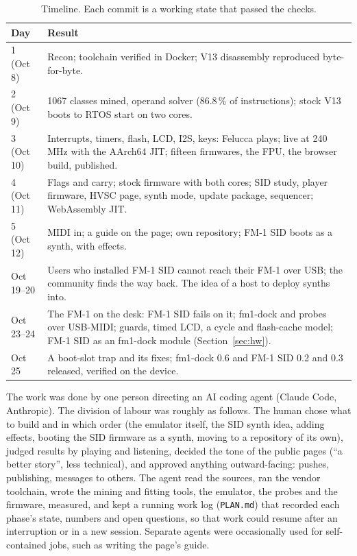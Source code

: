 \documentclass[10pt,a4paper]{article}
\newcommand{\code}[1]{\texttt{#1}}
\begin{document}
\begin{table}[t]
\centering\footnotesize
\begin{tabularx}{\textwidth}{@{}lX@{}}
\toprule
Day & Result\\
\midrule
1 (Oct 8) & Recon; toolchain verified in Docker; V13 disassembly reproduced byte-for-byte.\\
2 (Oct 9) & 1067 classes mined, operand solver (86.8\,\% of instructions); stock V13 boots to RTOS start on two cores.\\
3 (Oct 10) & Interrupts, timers, flash, LCD, I2S, keys: Felucca plays; live at 240\,MHz with the AArch64 JIT; fifteen firmwares, the FPU, the browser build, published.\\
4 (Oct 11) & Flags and carry; stock firmware with both cores; SID study, player firmware, HVSC page, synth mode, update package, sequencer; WebAssembly JIT.\\
5 (Oct 12) & MIDI in; a guide on the page; own repository; FM-1 SID boots as a synth, with effects.\\
Oct 19--20 & Users who installed FM-1 SID cannot reach their FM-1 over USB; the community finds the way back. The idea of a host to deploy synths into.\\
Oct 23--24 & The FM-1 on the desk: FM-1 SID fails on it; fm1-dock and probes over USB-MIDI; guards, timed LCD, a cycle and flash-cache model; FM-1 SID as an fm1-dock module (Section~\ref{sec:hw}).\\
Oct 25 & A boot-slot trap and its fixes; fm1-dock 0.6 and FM-1 SID 0.2 and 0.3 released, verified on the device.\\
\bottomrule
\end{tabularx}
\caption{Timeline. Each commit is a working state that passed the checks.}
\label{tab:time}
\end{table}

The work was done by one person directing an AI coding agent (Claude Code, Anthropic). The division
of labour was roughly as follows. The human chose what to build and in which order (the emulator
itself, the SID synth idea, adding effects, booting the SID firmware as a synth, moving to a
repository of its own), judged results by playing and listening, decided the tone of the public
pages (``a better story'', less technical), and approved anything outward-facing: pushes, publishing,
messages to others. The agent read the sources, ran the vendor toolchain, wrote the mining and
fitting tools, the emulator, the probes and the firmware, measured, and kept a running work log
(\code{PLAN.md}) that recorded each phase's state, numbers and open questions, so that work could
resume after an interruption or in a new session. Separate agents were occasionally used for
self-contained jobs, such as writing the page's guide.
\end{document}
